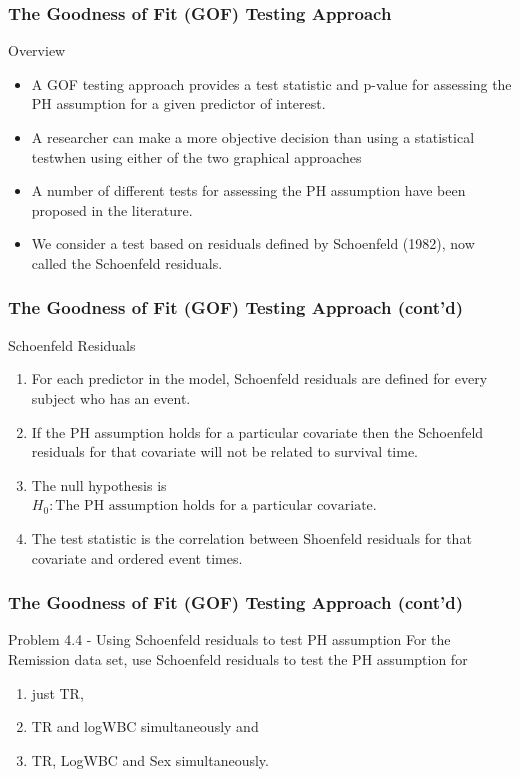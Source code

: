 \documentclass{beamer}
\theoremstyle{definition}
\begin{document}
\begin{frame} 
\frametitle{The Goodness of Fit (GOF) Testing Approach}
\begin{block}{Overview}
\begin{itemize} 
\item A GOF testing approach provides a test statistic and p-value for
assessing the PH assumption for a given predictor of interest.
\item A researcher can make a more objective decision than using a statistical testwhen using either of
the two graphical approaches
\item A number of different tests for assessing the PH
assumption have been proposed in the literature.
\item We consider a test  based on residuals
defined by Schoenfeld (1982), now called the Schoenfeld
residuals.
\end{itemize} 
\end{block}
\end{frame} 

\begin{frame}
\frametitle{The Goodness of Fit (GOF) Testing Approach (cont'd)}
\begin{block}{Schoenfeld Residuals}
\begin{enumerate}
\item For each predictor in the model, Schoenfeld
residuals are defined for every subject who
has an event.
\item If the PH assumption holds for a particular covariate
then the Schoenfeld residuals for that
covariate will not be related to survival time.
\item The null hypothesis is $H_0: \text{The PH assumption holds for a particular covariate}$. 
\item The test statistic is the correlation between Shoenfeld residuals for that covariate and ordered event times. 
\end{enumerate} 
\end{block}
\end{frame} 

\begin{frame} 
\frametitle{The Goodness of Fit (GOF) Testing Approach (cont'd)}
\begin{block}{Problem 4.4 - Using Schoenfeld residuals to test PH assumption}
For the Remission data set, use Schoenfeld residuals to test the PH assumption for
\begin{enumerate}
\item just TR, 
\item TR and logWBC simultaneously and 
\item TR, LogWBC and Sex simultaneously. 
\end{enumerate} 
\end{block}
\end{frame} 
\end{document}

